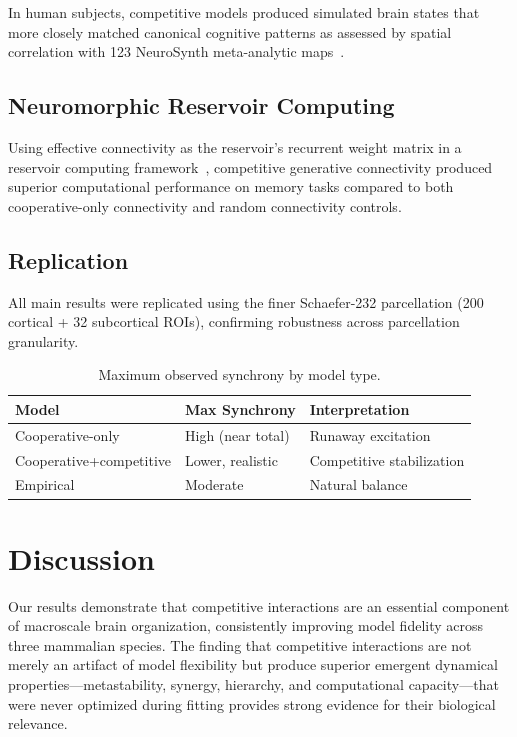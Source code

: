\documentclass[11pt]{article}
\begin{document}
In human subjects, competitive models produced simulated brain states that more closely matched canonical cognitive patterns as assessed by spatial correlation with 123 NeuroSynth meta-analytic maps~\citep{yarkoni2011neurosynth}.

\subsection{Neuromorphic Reservoir Computing}

Using effective connectivity as the reservoir's recurrent weight matrix in a reservoir computing framework~\citep{jaeger2001echo,maass2002real}, competitive generative connectivity produced superior computational performance on memory tasks compared to both cooperative-only connectivity and random connectivity controls.

\subsection{Replication}

All main results were replicated using the finer Schaefer-232 parcellation (200 cortical + 32 subcortical ROIs), confirming robustness across parcellation granularity.

\begin{table}[ht]
\centering
\caption{Maximum observed synchrony by model type.}
\label{tab:sync}
\begin{tabular}{@{}lll@{}}
\toprule
Model & Max Synchrony & Interpretation \\
\midrule
Cooperative-only & High (near total) & Runaway excitation \\
Cooperative+competitive & Lower, realistic & Competitive stabilization \\
Empirical & Moderate & Natural balance \\
\bottomrule
\end{tabular}
\end{table}

\section{Discussion}

Our results demonstrate that competitive interactions are an essential component of macroscale brain organization, consistently improving model fidelity across three mammalian species.  The finding that competitive interactions are not merely an artifact of model flexibility but produce superior emergent dynamical properties---metastability, synergy, hierarchy, and computational capacity---that were never optimized during fitting provides strong evidence for their biological relevance.
\end{document}
